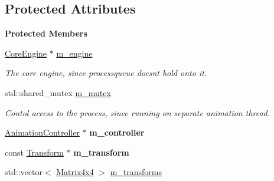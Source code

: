 \subsection*{Protected Attributes}
\begin{Indent}\textbf{ Protected Members}\par
\begin{DoxyCompactItemize}
\item 
\mbox{\label{classrev_1_1_animation_process_a9571f2444829d2ef4fefc9489479ea36}} 
\mbox{\hyperlink{classrev_1_1_core_engine}{Core\+Engine}} $\ast$ \mbox{\hyperlink{classrev_1_1_animation_process_a9571f2444829d2ef4fefc9489479ea36}{m\+\_\+engine}}
\begin{DoxyCompactList}\small\item\em The core engine, since processqueue doesn\textquotesingle{}t hold onto it. \end{DoxyCompactList}\item 
\mbox{\label{classrev_1_1_animation_process_ae2a9c27040fceae12e8e2a151bb0e20b}} 
std\+::shared\+\_\+mutex \mbox{\hyperlink{classrev_1_1_animation_process_ae2a9c27040fceae12e8e2a151bb0e20b}{m\+\_\+mutex}}
\begin{DoxyCompactList}\small\item\em Contol access to the process, since running on separate animation thread. \end{DoxyCompactList}\item 
\mbox{\label{classrev_1_1_animation_process_abc39208a03524f6626070657810b8c73}} 
\mbox{\hyperlink{classrev_1_1_animation_controller}{Animation\+Controller}} $\ast$ {\bfseries m\+\_\+controller}
\item 
\mbox{\label{classrev_1_1_animation_process_ae30d2259bbc31da675e40d453126b067}} 
const \mbox{\hyperlink{classrev_1_1_transform}{Transform}} $\ast$ {\bfseries m\+\_\+transform}
\item 
\mbox{\label{classrev_1_1_animation_process_a440defc4cb5858f6a3cc71bdc51da41f}} 
std\+::vector$<$ \mbox{\hyperlink{classrev_1_1_square_matrix}{Matrix4x4}} $>$ \mbox{\hyperlink{classrev_1_1_animation_process_a440defc4cb5858f6a3cc71bdc51da41f}{m\+\_\+transforms}}

\end{DoxyCompactItemize}
\end{Indent}
